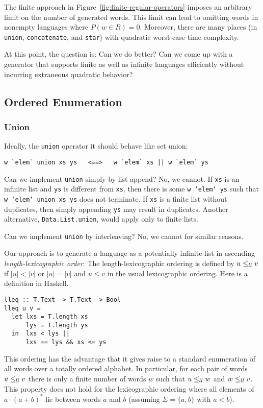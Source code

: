The finite approach in Figure~\ref{fig:finite-regular-operators}
imposes an arbitrary limit on the number of generated words. This
limit can lead to omitting words in nonempty languages where $P (w\in
R) = 0$. Moreover, there are many places (in \texttt{union},
\texttt{concatenate}, and \texttt{star}) with quadratic worst-case
time complexity. 

At this point, the question is: Can we do better? Can we come up with
a generator that supports finite as well as infinite languages
efficiently without incurring extraneous quadratic behavior?


\subsection{Ordered Enumeration}
\label{sec:ordered-enumeration}


\subsubsection{Union}
Ideally, the \texttt{union} operator it should behave like
set union:
\begin{verbatim}
w `elem` union xs ys   <==>   w `elem` xs || w `elem` ys
\end{verbatim}
Can we implement \texttt{union} simply by list append?
No, we cannot. 
If \texttt{xs} is an infinite list and \texttt{ys} is different from
\texttt{xs}, then there is some \texttt{w `elem` ys} such that
\texttt{w `elem` union xs ys} does not terminate.
If \texttt{xs} is a finite list without duplicates, then simply
appending \texttt{ys} may result in duplicates.
Another alternative, \texttt{Data.List.union}, would apply only to finite lists.

Can we implement \texttt{union} by interleaving? No, we cannot for
similar reasons.

Our approach is to generate a language as a potentially infinite list
in ascending \emph{length-lexicographic order}. The
length-lexicographic ordering is defined by $u \le_{ll} 
v$ if $|u|<|v|$ or $|u|=|v|$ and $u\le v$ in the usual lexicographic
ordering. Here is a definition in Haskell.
\begin{verbatim}
lleq :: T.Text -> T.Text -> Bool
lleq u v =
  let lxs = T.length xs
      lys = T.length ys
  in  lxs < lys ||
      lxs == lys && xs <= ys
\end{verbatim}
This ordering has the advantage that it gives raise to a standard
enumeration of all words over a totally ordered alphabet. In
particular, for each pair of words $u \le_{ll} v$ there is only a finite
number of words $w$ such that $u \le_{ll} w$ and $w \le_{ll} v$. This property does
not hold for the lexicographic ordering where all elements of $a\cdot
(a+b)^*$ lie between words $a$ and $b$ (assuming $\Sigma = \{a, b\}$
with $a<b$).

